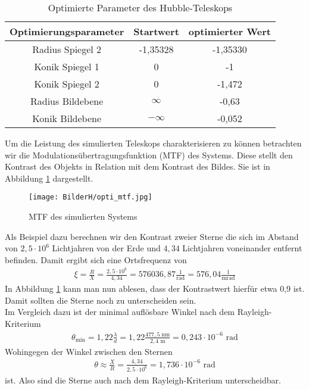 \documentclass[twoside,colorback,accentcolor=tud4c,11pt]{tudreport}
\begin{document}
\begin{table}[H]
\centering
\begin{tabular}{|c|c|c|}
\hline 
Optimierungsparameter & Startwert & optimierter Wert \\ 
\hline 
Radius Spiegel 2 & -1,35328 & -1,35330 \\ 
\hline 
Konik Spiegel 1 & 0 & -1 \\ 
\hline 
Konik Spiegel 2 & 0 & -1,472 \\ 
\hline 
Radius Bildebene & $\infty$ & -0,63 \\ 
\hline 
Konik Bildebene & $-\infty$ & -0,052 \\ 
\hline 
\end{tabular} 
\caption{Optimierte Parameter des Hubble-Teleskops}\label{tab:hubopti}
\end{table}
Um die Leistung des simulierten Teleskops charakterisieren zu können betrachten wir die Modulationsübertragungsfunktion (MTF) des Systems. Diese stellt den Kontrast des Objekts in Relation mit dem Kontrast des Bildes. Sie ist in Abbildung \ref{fig:hubmtfopti} dargestellt.

\begin{figure}[H]
\centering
   	\begin{minipage}[b]{\textwidth}
   	\texttt{[image: BilderH/opti\_mtf.jpg]}
   	\caption{MTF des simulierten Systems}
  	\label{fig:hubmtfopti}
   	\end{minipage}
\end{figure}

Als Beispiel dazu berechnen wir den Kontrast zweier Sterne die sich im Abstand von $2,5\cdot 10^6$ Lichtjahren von der Erde und $4,34$ Lichtjahren voneinander entfernt befinden. Damit ergibt sich eine Ortsfrequenz von
\begin{align}
\xi=\frac{R}{X}=\frac{2,5\cdot 10^6}{4,34}=576036,87\frac{1}{\text{rad}}=576,04\frac{1}{\text{mrad}}
\end{align}
In Abbildung \ref{fig:hubmtfopti} kann man nun ablesen, dass der Kontrastwert hierfür etwa 0,9 ist. Damit sollten die Sterne noch zu unterscheiden sein. \\
Im Vergleich dazu ist der minimal auflösbare Winkel nach dem Rayleigh-Kriterium
\begin{align}
\theta_{\text{min}}=1,22\frac{\lambda}{d}=1,22\frac{477,5\text{ nm}}{2,4\text{ m}}=0,243\cdot 10^{-6}\text{ rad}
\end{align}
Wohingegen der Winkel zwischen den Sternen 
\begin{align}
\theta\approx\frac{X}{R}=\frac{4,34}{2,5\cdot 10^6}=1,736\cdot 10^{-6}\text{ rad}
\end{align}
ist. Also sind die Sterne auch nach dem Rayleigh-Kriterium unterscheidbar.
\end{document}

